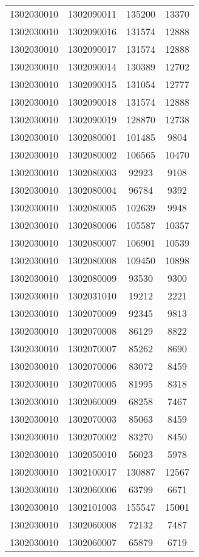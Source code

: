 \begin{longtable}[h]{llcc}
		1302030010 & 1302090011 & 135200 & 13370\\
		1302030010 & 1302090016 & 131574 & 12888\\
		1302030010 & 1302090017 & 131574 & 12888\\
		1302030010 & 1302090014 & 130389 & 12702\\
		1302030010 & 1302090015 & 131054 & 12777\\
		1302030010 & 1302090018 & 131574 & 12888\\
		1302030010 & 1302090019 & 128870 & 12738\\
		1302030010 & 1302080001 & 101485 & 9804\\
		1302030010 & 1302080002 & 106565 & 10470\\
		1302030010 & 1302080003 & 92923 & 9108\\
		1302030010 & 1302080004 & 96784 & 9392\\
		1302030010 & 1302080005 & 102639 & 9948\\
		1302030010 & 1302080006 & 105587 & 10357\\
		1302030010 & 1302080007 & 106901 & 10539\\
		1302030010 & 1302080008 & 109450 & 10898\\
		1302030010 & 1302080009 & 93530 & 9300\\
		1302030010 & 1302031010 & 19212 & 2221\\
		1302030010 & 1302070009 & 92345 & 9813\\
		1302030010 & 1302070008 & 86129 & 8822\\
		1302030010 & 1302070007 & 85262 & 8690\\
		1302030010 & 1302070006 & 83072 & 8459\\
		1302030010 & 1302070005 & 81995 & 8318\\
		1302030010 & 1302060009 & 68258 & 7467\\
		1302030010 & 1302070003 & 85063 & 8459\\
		1302030010 & 1302070002 & 83270 & 8450\\
		1302030010 & 1302050010 & 56023 & 5978\\
		1302030010 & 1302100017 & 130887 & 12567\\
		1302030010 & 1302060006 & 63799 & 6671\\
		1302030010 & 1302101003 & 155547 & 15001\\
		1302030010 & 1302060008 & 72132 & 7487\\
		1302030010 & 1302060007 & 65879 & 6719\\

\end{longtable}
